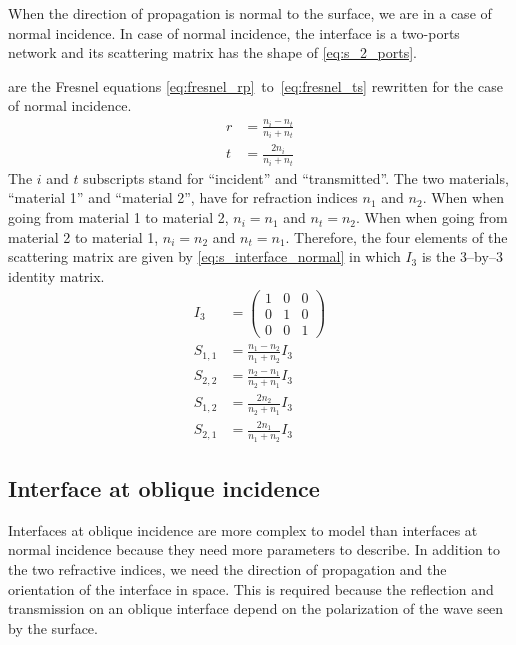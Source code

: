 When the direction of propagation is normal to the surface, we are in a case of normal incidence.
In case of normal incidence, the interface is a two-ports network and its scattering matrix has the shape of \cref{eq:s_2_ports}.

 are the Fresnel equations \eqref{eq:fresnel_rp}~to~\eqref{eq:fresnel_ts} rewritten for the case of normal incidence.
\begin{subequations}
    \begin{align}
        r &= \frac{n_i - n_t}{n_i + n_t} \label{eq:fresnel_normal_r}\\
        t &= \frac{2 n_i}{n_i + n_t} \label{eq:fresnel_normal_t}
    \end{align}
    \label{eq:fresnel_normal}
\end{subequations}
The $i$ and $t$ subscripts stand for ``incident'' and ``transmitted''.
The two materials, ``material 1'' and ``material 2'', have for refraction indices $n_1$ and $n_2$.
When when going from material 1 to material 2, $n_i = n_1$ and $n_t = n_2$.
When when going from material 2 to material 1, $n_i = n_2$ and $n_t = n_1$.
Therefore, the four elements of the scattering matrix are given by \cref{eq:s_interface_normal} in which $I_3$ is the 3--by--3 identity matrix.
\begin{subequations}
    \begin{align}
        I_3 &= \begin{pmatrix} 1&0&0\\0&1&0\\0&0&1 \end{pmatrix}
        \\
        S_{1, 1} &= \frac{n_1 - n_2}{n_1 + n_2} I_3
        \\
        S_{2, 2} &= \frac{n_2 - n_1}{n_2 + n_1} I_3
        \\
        S_{1, 2} &= \frac{2 n_2}{n_2 + n_1} I_3
        \\
        S_{2, 1} &= \frac{2 n_1}{n_1 + n_2} I_3
    \end{align}
    \label{eq:s_interface_normal}
\end{subequations}


\subsection{Interface at oblique incidence}
Interfaces at oblique incidence are more complex to model than interfaces at normal incidence because they need more parameters to describe.
In addition to the two refractive indices, we need the direction of propagation and the orientation of the interface in space.
This is required because the reflection and transmission on an oblique interface depend on the polarization of the wave seen by the surface.

